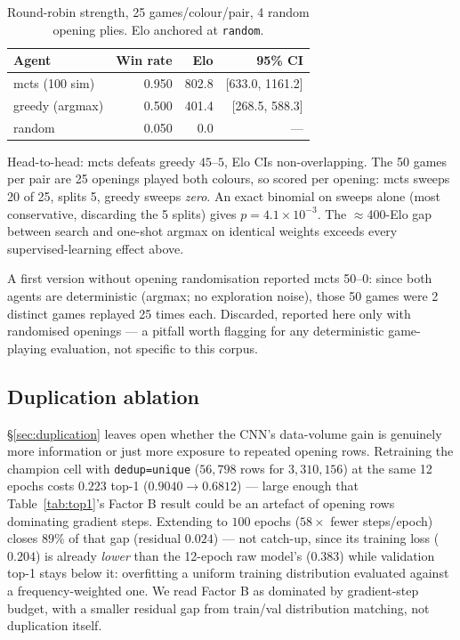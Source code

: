 \documentclass[conference,a4paper]{IEEEtran}
\begin{document}
\begin{table}[t]
\centering
\caption{Round-robin strength, 25 games/colour/pair, 4 random opening
plies. Elo anchored at \texttt{random}.}
\label{tab:tournament}
\begin{tabular}{lrrr}
\toprule
Agent & Win rate & Elo & 95\% CI \\
\midrule
mcts (100 sim) & 0.950 & 802.8 & [633.0, 1161.2] \\
greedy (argmax) & 0.500 & 401.4 & [268.5, 588.3] \\
random & 0.050 & 0.0 & --- \\
\bottomrule
\end{tabular}
\end{table}

Head-to-head: mcts defeats greedy $45$--$5$, Elo CIs non-overlapping. The 50
games per pair are 25 openings played both colours, so scored per opening:
mcts sweeps 20 of 25, splits 5, greedy sweeps \emph{zero}. An exact binomial
on sweeps alone (most conservative, discarding the 5 splits) gives
$p{=}4.1\times10^{-3}$. The $\approx$400-Elo gap between search and one-shot
argmax on identical weights exceeds every supervised-learning effect above.

A first version without opening randomisation reported mcts 50--0: since
both agents are deterministic (argmax; no exploration noise), those 50 games
were 2 distinct games replayed 25 times each. Discarded, reported here only
with randomised openings --- a pitfall worth flagging for any deterministic
game-playing evaluation, not specific to this corpus.

\subsection{Duplication ablation}
\label{sec:dedupablation}
\S\ref{sec:duplication} leaves open whether the CNN's data-volume gain is
genuinely more information or just more exposure to repeated opening rows.
Retraining the champion cell with \texttt{dedup=unique} ($56{,}798$ rows for
$3{,}310{,}156$) at the same 12 epochs costs $0.223$ top-1
($0.9040\to0.6812$) --- large enough that Table~\ref{tab:top1}'s Factor B
result could be an artefact of opening rows dominating gradient steps.
Extending to $100$ epochs ($58\times$ fewer steps/epoch) closes $89\%$ of
that gap (residual $0.024$) --- not catch-up, since its training loss
($0.204$) is already \emph{lower} than the 12-epoch raw model's ($0.383$)
while validation top-1 stays below it: overfitting a uniform training
distribution evaluated against a frequency-weighted one. We read Factor B as
dominated by gradient-step budget, with a smaller residual gap from
train/val distribution matching, not duplication itself.
\end{document}
